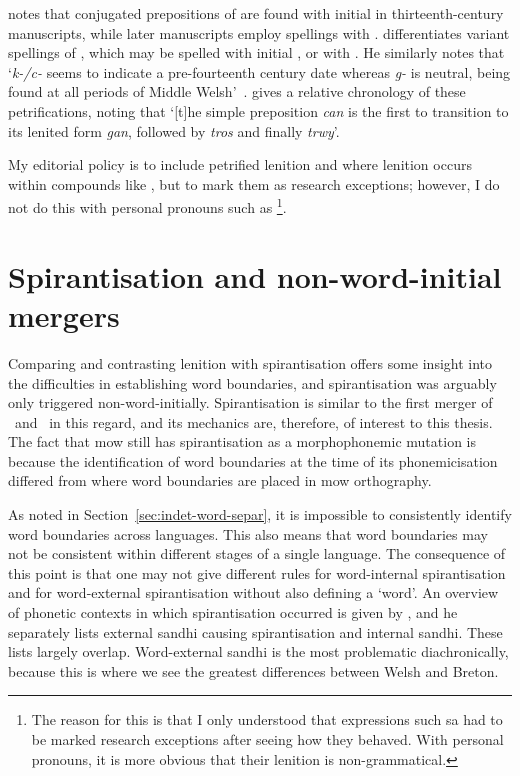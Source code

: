 \Textcite[52]{jongeleen_lenition_2016} notes that conjugated prepositions of  are found with initial   in thirteenth-century manuscripts, while later manuscripts employ spellings with .
\Textcite{sims-williams_variation_2013} differentiates variant spellings of , which may be spelled with initial , or with .
He similarly notes that `\textit{k-/c-} seems to indicate a pre-fourteenth century date whereas \textit{g-} is neutral, being found at all periods of Middle Welsh'~\autocite[24]{sims-williams_variation_2013}. \Textcite[55]{jongeleen_lenition_2016} gives a relative chronology of these petrifications, noting that `[t]he simple preposition \textit{can} is the first to transition to its lenited form \textit{gan}, followed by \textit{tros} and finally \textit{trwy}'.

My editorial policy is to include petrified lenition and where lenition occurs within compounds like , but to mark them as research exceptions; however, I do not do this with personal pronouns such as \footnote{The reason for this is that I only understood that expressions such sa  had to be marked research exceptions after seeing how they behaved. With personal pronouns, it is more obvious that their lenition is non-grammatical.}.

\section{Spirantisation and non-word-initial mergers}
\label{sec:spirantization}

Comparing and contrasting lenition with spirantisation offers some insight into the difficulties in establishing word boundaries, and  spirantisation was arguably only triggered non-word-initially.
Spirantisation is similar to the first merger of \lT\ and \xD\ in this regard, and its mechanics are, therefore, of interest to this thesis.
The fact that \gls{mow} still has spirantisation as a morphophonemic mutation is because the identification of word boundaries at the time of its phonemicisation differed from where word boundaries are placed in \gls{mow} orthography.

As noted in Section~\ref{sec:indet-word-separ}, it is impossible to consistently identify word boundaries across languages.
This also means that word boundaries may not be consistent within different stages of a single language.
The consequence of this point is that one may not give different rules for word-internal spirantisation and for word-external spirantisation without also defining a `word'.
An overview of phonetic contexts in which spirantisation occurred is given by \textcite[2--3]{schrijver_spirantization_1999}, and he separately lists external sandhi causing spirantisation and internal sandhi.
These lists largely overlap.
Word-external sandhi is the most problematic diachronically, because this is where we see the greatest differences between Welsh and Breton.

